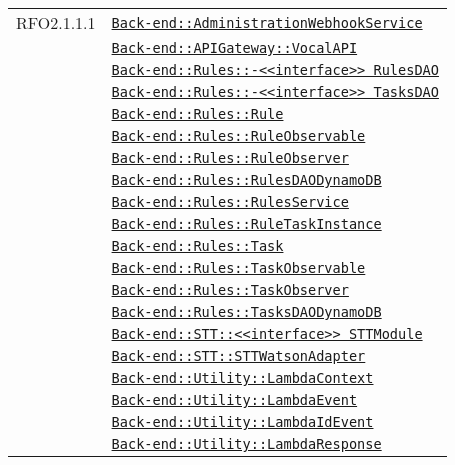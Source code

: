 \begin{longtable}{|>{\centering}m{3cm}|m{10cm}<{\centering}|}
RFO2.1.1.1 & \hyperref[Back-end::AdministrationWebhookService]{\texttt{Back-end::AdministrationWebhookService}}\\
& \hyperref[Back-end::APIGateway::VocalAPI]{\texttt{Back-end::APIGateway::VocalAPI}}\\
& \hyperref[Back-end::Rules::<<interface>> RulesDAO]{\texttt{Back-end::Rules::-\linebreak <<interface>> RulesDAO}}\\
& \hyperref[Back-end::Rules::<<interface>> TasksDAO]{\texttt{Back-end::Rules::-\linebreak <<interface>> TasksDAO}}\\
& \hyperref[Back-end::Rules::Rule]{\texttt{Back-end::Rules::Rule}}\\
& \hyperref[Back-end::Rules::RuleObservable]{\texttt{Back-end::Rules::RuleObservable}}\\
& \hyperref[Back-end::Rules::RuleObserver]{\texttt{Back-end::Rules::RuleObserver}}\\
& \hyperref[Back-end::Rules::RulesDAODynamoDB]{\texttt{Back-end::Rules::RulesDAODynamoDB}}\\
& \hyperref[Back-end::Rules::RulesService]{\texttt{Back-end::Rules::RulesService}}\\
& \hyperref[Back-end::Rules::RuleTaskInstance]{\texttt{Back-end::Rules::RuleTaskInstance}}\\
& \hyperref[Back-end::Rules::Task]{\texttt{Back-end::Rules::Task}}\\
& \hyperref[Back-end::Rules::TaskObservable]{\texttt{Back-end::Rules::TaskObservable}}\\
& \hyperref[Back-end::Rules::TaskObserver]{\texttt{Back-end::Rules::TaskObserver}}\\
& \hyperref[Back-end::Rules::TasksDAODynamoDB]{\texttt{Back-end::Rules::TasksDAODynamoDB}}\\
& \hyperref[Back-end::STT::<<interface>> STTModule]{\texttt{Back-end::STT::<<interface>> STTModule}}\\
& \hyperref[Back-end::STT::STTWatsonAdapter]{\texttt{Back-end::STT::STTWatsonAdapter}}\\
& \hyperref[Back-end::Utility::LambdaContext]{\texttt{Back-end::Utility::LambdaContext}}\\
& \hyperref[Back-end::Utility::LambdaEvent]{\texttt{Back-end::Utility::LambdaEvent}}\\
& \hyperref[Back-end::Utility::LambdaIdEvent]{\texttt{Back-end::Utility::LambdaIdEvent}}\\
& \hyperref[Back-end::Utility::LambdaResponse]{\texttt{Back-end::Utility::LambdaResponse}}\\

\end{longtable}
